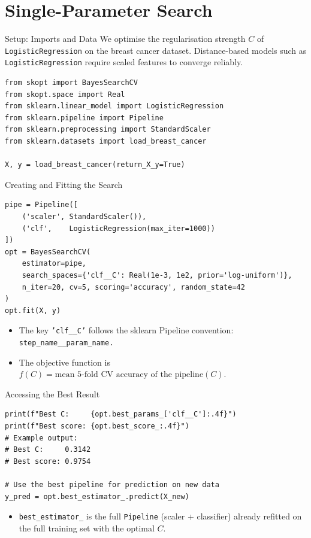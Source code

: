 \documentclass{beamer}
\begin{document}
\section{Single-Parameter Search}

\begin{frame}[fragile]{Setup: Imports and Data}
  We optimise the regularisation strength \(C\) of \texttt{LogisticRegression} on the breast cancer dataset.
  Distance-based models such as \texttt{LogisticRegression} require scaled features to converge reliably.
  \begin{lstlisting}
from skopt import BayesSearchCV
from skopt.space import Real
from sklearn.linear_model import LogisticRegression
from sklearn.pipeline import Pipeline
from sklearn.preprocessing import StandardScaler
from sklearn.datasets import load_breast_cancer

X, y = load_breast_cancer(return_X_y=True)
  \end{lstlisting}
\end{frame}

\begin{frame}[fragile]{Creating and Fitting the Search}
  \begin{lstlisting}
pipe = Pipeline([
    ('scaler', StandardScaler()),
    ('clf',    LogisticRegression(max_iter=1000))
])
opt = BayesSearchCV(
    estimator=pipe,
    search_spaces={'clf__C': Real(1e-3, 1e2, prior='log-uniform')},
    n_iter=20, cv=5, scoring='accuracy', random_state=42
)
opt.fit(X, y)
  \end{lstlisting}
  \begin{itemize}
    \item The key \texttt{'clf\_\_C'} follows the sklearn Pipeline convention: \texttt{step\_name\_\_param\_name.}
    \item The objective function is \(f(C) = \text{mean 5-fold CV accuracy of the pipeline}(C).\)
  \end{itemize}
\end{frame}

\begin{frame}[fragile]{Accessing the Best Result}
  \begin{lstlisting}
print(f"Best C:     {opt.best_params_['clf__C']:.4f}")
print(f"Best score: {opt.best_score_:.4f}")
# Example output:
# Best C:     0.3142
# Best score: 0.9754

# Use the best pipeline for prediction on new data
y_pred = opt.best_estimator_.predict(X_new)
  \end{lstlisting}
  \begin{itemize}
    \item \texttt{best\_estimator\_} is the full \texttt{Pipeline} (scaler + classifier) already refitted on the full training set with the optimal \(C.\)
  \end{itemize}
\end{frame}
\end{document}
